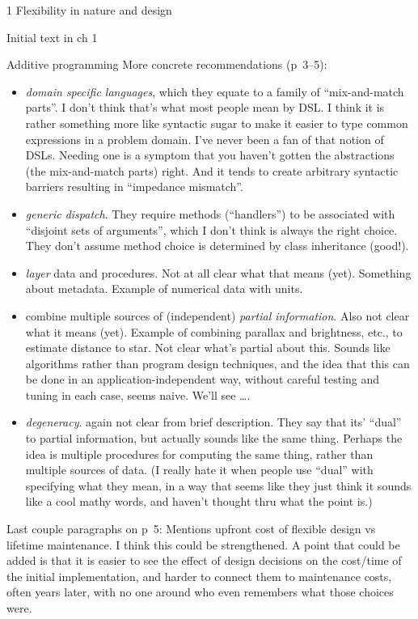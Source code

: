 \documentclass[11pt]{PalisadesLakesBook}
\begin{document}
\begin{plSection}{}
\begin{plSection}{1 Flexibility in nature and design}
\begin{plSection}{Initial text in ch 1}
\begin{plSection}{Additive programming}
More concrete recommendations (p~3--5):
\begin{itemize}
  \item \emph{domain specific languages}, 
  which they equate to a family
  of ``mix-and-match parts''. I don't think that's 
  what most people mean by DSL. 
  I think it is rather something more like
  syntactic sugar to make it easier to type common expressions
  in a problem domain. I've never been a fan of that notion of
  DSLs. Needing one is a symptom that you haven't gotten the
  abstractions (the mix-and-match parts) right. And it tends
  to create arbitrary syntactic barriers resulting in 
  ``impedance mismatch''.
  \item \emph{generic dispatch}. They require methods (``handlers'')
  to be associated with ``disjoint sets of arguments'', 
  which I don't think is always the right choice.
  They don't assume method choice is determined by class
  inheritance (good!).
  \item \emph{layer} data and procedures. Not at all clear what 
  that means (yet). Something about metadata.
  Example of numerical data with units.  
  \item combine multiple sources of (independent) 
  \emph{partial information}. 
  Also not clear what it means (yet).
  Example of combining parallax and brightness, etc., to estimate
  distance to star. 
  Not clear what's partial about this.
  Sounds like algorithms rather than
  program design techniques, and the idea that this can be done
  in an application-independent way, without careful
  testing and tuning in each case, seems naive.
  We'll see {\ldots}.
  \item \emph{degeneracy}. again not clear from brief description.
  They say that its' ``dual'' to partial
  information, but actually sounds like the same thing.
  Perhaps the idea is multiple procedures for computing the same
  thing, rather than multiple sources of data.
  (I really hate it when people use ``dual'' with specifying
  what they mean, in a way that seems like they just
  think it sounds like a cool mathy words, 
  and haven't thought thru what the point is.)
\end{itemize}

Last couple paragraphs on p~5:
Mentions upfront cost of flexible design vs
lifetime maintenance.
I think this could be strengthened.
A point that could be added is that 
it is easier to see the effect of design decisions 
on the cost/time of the initial implementation,
and harder to connect them to maintenance costs, 
often years later, with no one around who even remembers 
what those choices were. 


\end{plSection}
\end{plSection}
\end{plSection}
\end{plSection}
\end{document}
